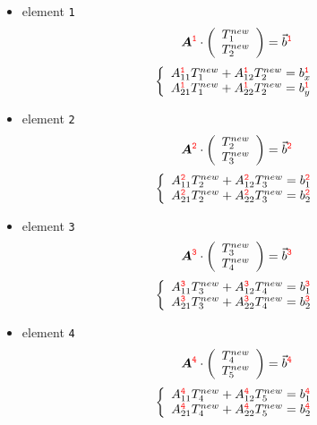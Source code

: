 \begin{itemize}
\item element {\color{red}\tt 1} 
\[
{\bm A}^{\color{red} \tt 1}  \cdot 
\left(
\begin{array}{c}
T_1^{new} \\ T_2^{new}
\end{array}
\right)
 =  {\vec b}^{\color{red} \tt 1}
\]
\[
\left\{ 
\begin{array}{l}
A_{11}^{{\color{red}\tt 1}} T_1^{new} + A_{12}^{{\color{red}\tt 1}} T_2^{new} = b^{{\color{red} \tt 1}}_x \\
A_{21}^{{\color{red}\tt 1}} T_1^{new} + A_{22}^{{\color{red}\tt 1}} T_2^{new} = b^{{\color{red} \tt 1}}_y
\end{array}
\right.
\]

\item element {\color{red}\tt 2} 
\[
{\bm A}^{\color{red} \tt 2}  \cdot 
\left(
\begin{array}{c}
T_2^{new} \\ T_3^{new}
\end{array}
\right)
 =  {\vec b}^{\color{red} \tt 2}
\]
\[
\left\{ 
\begin{array}{l}
A_{11}^{{\color{red}\tt 2}} T_2^{new} + A_{12}^{{\color{red}\tt 2}} T_3^{new} = b^{{\color{red} \tt 2}}_1 \\
A_{21}^{{\color{red}\tt 2}} T_2^{new} + A_{22}^{{\color{red}\tt 2}} T_3^{new} = b^{{\color{red} \tt 2}}_2
\end{array}
\right.
\]


\item element {\color{red}\tt 3} 
\[
{\bm A}^{\color{red} \tt 3}  \cdot 
\left(
\begin{array}{c}
T_3^{new} \\ T_4^{new}
\end{array}
\right)
 =  {\vec b}^{\color{red} \tt 3}
\]
\[
\left\{ 
\begin{array}{l}
A_{11}^{{\color{red}\tt 3}} T_3^{new} + A_{12}^{{\color{red} \tt 3}} T_4^{new} = b^{{\color{red} \tt 3}}_1 \\
A_{21}^{{\color{red}\tt 3}} T_3^{new} + A_{22}^{{\color{red} \tt 3}} T_4^{new} = b^{{\color{red} \tt 3}}_2
\end{array}
\right.
\]


\item element {\color{red}\tt 4} 
\[
{\bm A}^{\color{red} \tt 4}  \cdot 
\left(
\begin{array}{c}
T_4^{new} \\ T_5^{new}
\end{array}
\right)
 =  {\vec b}^{\color{red} \tt 4}
\]
\[
\left\{ 
\begin{array}{l}
A_{11}^{{\color{red}\tt 4}} T_4^{new} + A_{12}^{{\color{red}\tt 4}} T_5^{new} = b^{{\color{red}\tt 4}}_1 \\
A_{21}^{{\color{red}\tt 4}} T_4^{new} + A_{22}^{{\color{red}\tt 4}} T_5^{new} = b^{{\color{red}\tt 4}}_2
\end{array}
\right.
\]
\end{itemize}

